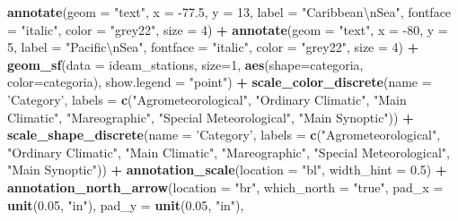 \documentclass[12pt,oneside]{reedthesis}
\newenvironment{Shaded}{\begin{snugshade}}{\end{snugshade}}
\newcommand{\CharTok}[1]{\textcolor[rgb]{0.31,0.60,0.02}{#1}}
\newcommand{\DataTypeTok}[1]{\textcolor[rgb]{0.13,0.29,0.53}{#1}}
\newcommand{\DecValTok}[1]{\textcolor[rgb]{0.00,0.00,0.81}{#1}}
\newcommand{\FloatTok}[1]{\textcolor[rgb]{0.00,0.00,0.81}{#1}}
\newcommand{\KeywordTok}[1]{\textcolor[rgb]{0.13,0.29,0.53}{\textbf{#1}}}
\newcommand{\NormalTok}[1]{#1}
\newcommand{\OperatorTok}[1]{\textcolor[rgb]{0.81,0.36,0.00}{\textbf{#1}}}
\newcommand{\StringTok}[1]{\textcolor[rgb]{0.31,0.60,0.02}{#1}}
\begin{document}
\begin{Shaded}
\begin{Highlighting}[]
\StringTok{  }\KeywordTok{annotate}\NormalTok{(}\DataTypeTok{geom =} \StringTok{"text"}\NormalTok{, }\DataTypeTok{x =} \FloatTok{-77.5}\NormalTok{, }\DataTypeTok{y =} \DecValTok{13}\NormalTok{, }\DataTypeTok{label =} \StringTok{"Caribbean}\CharTok{\textbackslash{}n}\StringTok{Sea"}\NormalTok{, }\DataTypeTok{fontface =} \StringTok{"italic"}\NormalTok{, }\DataTypeTok{color =} \StringTok{"grey22"}\NormalTok{, }\DataTypeTok{size =} \DecValTok{4}\NormalTok{) }\OperatorTok{+}\StringTok{ }
\StringTok{  }\KeywordTok{annotate}\NormalTok{(}\DataTypeTok{geom =} \StringTok{"text"}\NormalTok{, }\DataTypeTok{x =} \DecValTok{-80}\NormalTok{, }\DataTypeTok{y =} \DecValTok{5}\NormalTok{, }\DataTypeTok{label =} \StringTok{"Pacific}\CharTok{\textbackslash{}n}\StringTok{Sea"}\NormalTok{, }\DataTypeTok{fontface =} \StringTok{"italic"}\NormalTok{, }\DataTypeTok{color =} \StringTok{"grey22"}\NormalTok{, }\DataTypeTok{size =} \DecValTok{4}\NormalTok{) }\OperatorTok{+}
\StringTok{  }\KeywordTok{geom_sf}\NormalTok{(}\DataTypeTok{data =}\NormalTok{ ideam_stations, }\DataTypeTok{size=}\DecValTok{1}\NormalTok{, }\KeywordTok{aes}\NormalTok{(}\DataTypeTok{shape=}\NormalTok{categoria, }\DataTypeTok{color=}\NormalTok{categoria), }\DataTypeTok{show.legend =} \StringTok{"point"}\NormalTok{) }\OperatorTok{+}\StringTok{ }
\StringTok{  }\KeywordTok{scale_color_discrete}\NormalTok{(}\DataTypeTok{name =} \StringTok{'Category'}\NormalTok{, }\DataTypeTok{labels =} \KeywordTok{c}\NormalTok{(}\StringTok{"Agrometeorological"}\NormalTok{, }\StringTok{"Ordinary Climatic"}\NormalTok{, }\StringTok{"Main Climatic"}\NormalTok{, }\StringTok{"Mareographic"}\NormalTok{, }
   \StringTok{"Special Meteorological"}\NormalTok{, }\StringTok{"Main Synoptic"}\NormalTok{)) }\OperatorTok{+}
\StringTok{  }\KeywordTok{scale_shape_discrete}\NormalTok{(}\DataTypeTok{name =} \StringTok{'Category'}\NormalTok{, }\DataTypeTok{labels =} \KeywordTok{c}\NormalTok{(}\StringTok{"Agrometeorological"}\NormalTok{, }\StringTok{"Ordinary Climatic"}\NormalTok{, }\StringTok{"Main Climatic"}\NormalTok{, }\StringTok{"Mareographic"}\NormalTok{, }
   \StringTok{"Special Meteorological"}\NormalTok{, }\StringTok{"Main Synoptic"}\NormalTok{)) }\OperatorTok{+}\StringTok{  }
\StringTok{  }\KeywordTok{annotation_scale}\NormalTok{(}\DataTypeTok{location =} \StringTok{"bl"}\NormalTok{, }\DataTypeTok{width_hint =} \FloatTok{0.5}\NormalTok{) }\OperatorTok{+}\StringTok{ }
\StringTok{  }\KeywordTok{annotation_north_arrow}\NormalTok{(}\DataTypeTok{location =} \StringTok{"br"}\NormalTok{, }\DataTypeTok{which_north =} \StringTok{"true"}\NormalTok{, }\DataTypeTok{pad_x =} \KeywordTok{unit}\NormalTok{(}\FloatTok{0.05}\NormalTok{, }\StringTok{"in"}\NormalTok{), }\DataTypeTok{pad_y =} \KeywordTok{unit}\NormalTok{(}\FloatTok{0.05}\NormalTok{, }\StringTok{"in"}\NormalTok{), }

\end{Highlighting}
\end{Shaded}
\end{document}
